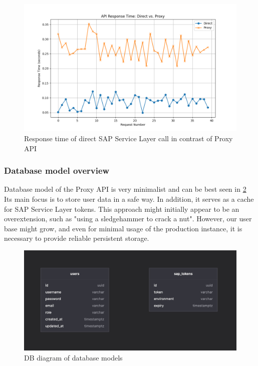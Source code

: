\begin{figure}[H]\centering
\includegraphics[width=140mm]{img/chap07/fig_api_response_direct_response_time.png}
\caption{Response time of direct SAP Service Layer call in contrast of Proxy API}
\label{img07:response_times}
\end{figure}

\subsubsection{Database model overview}
Database model of the Proxy API is very minimalist and can be best seen in \ref{img07:db_diagram}
Its main focus is to store user data in a safe way. 
In addition, it serves as a cache for SAP Service Layer tokens. 
This approach might initially appear to be an overextension, such as "using a sledgehammer to crack a nut". 
However, our user base might grow, and even for minimal usage of the production instance, it is necessary to provide reliable persistent storage.

\begin{figure}[H]\centering
\includegraphics[width=140mm]{img/chap07/fig_db-diagram.jpg}
\caption{DB diagram of database models}
\label{img07:db_diagram}
\end{figure}




